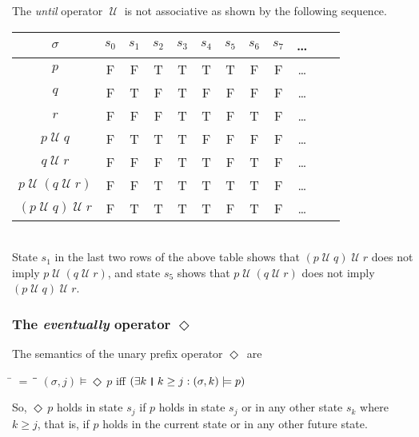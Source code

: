 \documentclass[12pt, fleqn, leqno]{article}
\newcommand{\lllgap}{12pt}                          %
\newcommand{\mymathindent}{24pt}                    %
\newcommand{\Until}{\;\mathcal{U}\;}
\newcommand{\Event}{\Diamond\,}
\newcommand{\myqedtab}{\hspace{384pt}}              %
\newcommand{\thedr}{\rule[-.25ex]{.32mm}{1.75ex}}   %
\newcommand{\dr}{\;\,\thedr\,\;}                    %
\newcommand{\rb}{:}                                 %
\newcommand{\ext}{\exists}                          %
\begin{document}
The \textit{until} operator $\Until$ is not associative as shown by the following sequence.\\[\lllgap]
\begin{tabular}{c|ccccccccccc}
  $\sigma$                  & $s_0$ & $s_1$ & $s_2$ & $s_3$ & $s_4$ & $s_5$ & $s_6$ & $s_7$ & \dots \\
  \hline
  $p$                       & F     & F     & T     & T     & T     & T     & F     & F     &  \dots\\
  $q$                       & F     & T     & F     & T     & F     & F     & F     & F     &  \dots\\
  $r$                       & F     & F     & F     & T     & T     & F     & T     & F     &  \dots\\
  $p\Until q$               & F     & T     & T     & T     & F     & F     & F     & F     &  \dots\\
  $q\Until r$               & F     & F     & F     & T     & T     & F     & T     & F     &  \dots\\
  $p\Until (q\Until r)$     & F     & F     & T     & T     & T     & T     & T     & F     &  \dots\\
  $(p\Until q)\Until r$     & F     & T     & T     & T     & T     & F     & T     & F     &  \dots
\end{tabular}\\[\lllgap]
State $s_1$ in the last two rows of the above table shows that $(p\Until q)\Until r$ does not imply $p\Until (q\Until r)$, and state $s_5$ shows that $p\Until (q\Until r)$ does not imply $(p\Until q)\Until r$.

\subsubsection*{The \textit{eventually} operator $\Event$}

The semantics of the unary prefix operator $\Event$ are
\begin{tabbing}
\hspace{\mymathindent} \= $= \;$ \= \myqedtab \= \kill
  \> $(\sigma, j) \models \Event p$ \quad iff \quad $(\ext k \dr k \ge j \rb (\sigma,k) \models p)$
\end{tabbing}
So, $\Event p$ holds in state $s_j$ if $p$ holds in state $s_j$ or in any other state $s_k$ where $k\ge j$, that is, if $p$ holds in the current state or in any other future state.
\end{document}
